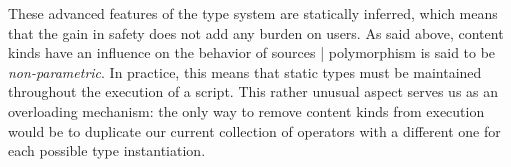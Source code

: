 These advanced features of the type system are statically inferred, which means
that the gain in safety does not add any burden on users. As said above, content
kinds have an influence on the behavior of sources |
polymorphism is said to be \emph{non-parametric}.
In practice, this means that static types must be
maintained throughout the execution of a script. This rather unusual aspect
serves us as an overloading mechanism: the only way to remove content kinds from
execution would be to duplicate our current collection of operators with a
different one for each possible type instantiation.

